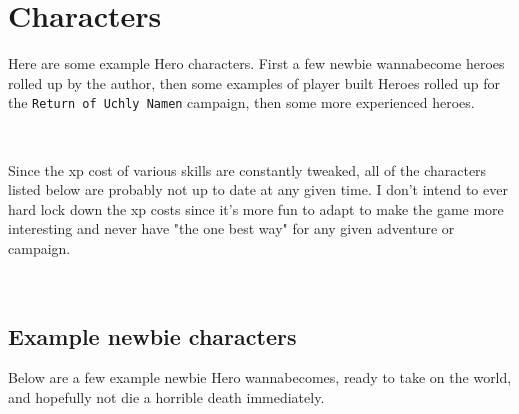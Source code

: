 

%
%


\cleardoublepage
\raggedbottom


\chapter*{Characters}
\label{cpt:characters}

Here are some example Hero characters. First a few newbie wannabecome heroes rolled up by the author, then some examples of player built Heroes rolled up for the \texttt{Return of Uchly Namen} campaign, then some more experienced heroes.

\

Since the xp cost of various skills are constantly tweaked, all of the characters listed below are probably not up to date at any given time. I don't intend to ever hard lock down the xp costs since it's more fun to adapt to make the game more interesting and never have "the one best way" for any given adventure or campaign.


\

\goodbreak
{} {}
\section*{Example newbie characters}

Below are a few example newbie Hero wannabecomes, ready to take on the world, and hopefully not die a horrible death immediately.

%
%







